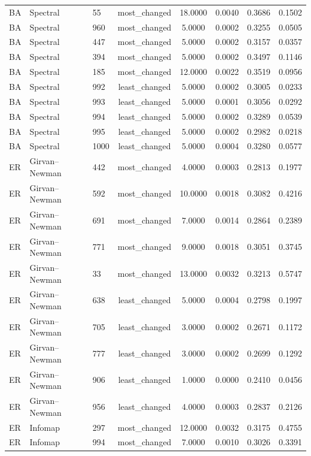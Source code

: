 \begin{longtable}{lllccccc}
BA & Spectral & 55 & most\_changed & 18.0000 & 0.0040 & 0.3686 & 0.1502 \\
BA & Spectral & 960 & most\_changed & 5.0000 & 0.0002 & 0.3255 & 0.0505 \\
BA & Spectral & 447 & most\_changed & 5.0000 & 0.0002 & 0.3157 & 0.0357 \\
BA & Spectral & 394 & most\_changed & 5.0000 & 0.0002 & 0.3497 & 0.1146 \\
BA & Spectral & 185 & most\_changed & 12.0000 & 0.0022 & 0.3519 & 0.0956 \\
BA & Spectral & 992 & least\_changed & 5.0000 & 0.0002 & 0.3005 & 0.0233 \\
BA & Spectral & 993 & least\_changed & 5.0000 & 0.0001 & 0.3056 & 0.0292 \\
BA & Spectral & 994 & least\_changed & 5.0000 & 0.0002 & 0.3289 & 0.0539 \\
BA & Spectral & 995 & least\_changed & 5.0000 & 0.0002 & 0.2982 & 0.0218 \\
BA & Spectral & 1000 & least\_changed & 5.0000 & 0.0004 & 0.3280 & 0.0577 \\
ER & Girvan--Newman & 442 & most\_changed & 4.0000 & 0.0003 & 0.2813 & 0.1977 \\
ER & Girvan--Newman & 592 & most\_changed & 10.0000 & 0.0018 & 0.3082 & 0.4216 \\
ER & Girvan--Newman & 691 & most\_changed & 7.0000 & 0.0014 & 0.2864 & 0.2389 \\
ER & Girvan--Newman & 771 & most\_changed & 9.0000 & 0.0018 & 0.3051 & 0.3745 \\
ER & Girvan--Newman & 33 & most\_changed & 13.0000 & 0.0032 & 0.3213 & 0.5747 \\
ER & Girvan--Newman & 638 & least\_changed & 5.0000 & 0.0004 & 0.2798 & 0.1997 \\
ER & Girvan--Newman & 705 & least\_changed & 3.0000 & 0.0002 & 0.2671 & 0.1172 \\
ER & Girvan--Newman & 777 & least\_changed & 3.0000 & 0.0002 & 0.2699 & 0.1292 \\
ER & Girvan--Newman & 906 & least\_changed & 1.0000 & 0.0000 & 0.2410 & 0.0456 \\
ER & Girvan--Newman & 956 & least\_changed & 4.0000 & 0.0003 & 0.2837 & 0.2126 \\
ER & Infomap & 297 & most\_changed & 12.0000 & 0.0032 & 0.3175 & 0.4755 \\
ER & Infomap & 994 & most\_changed & 7.0000 & 0.0010 & 0.3026 & 0.3391 \\

\end{longtable}
